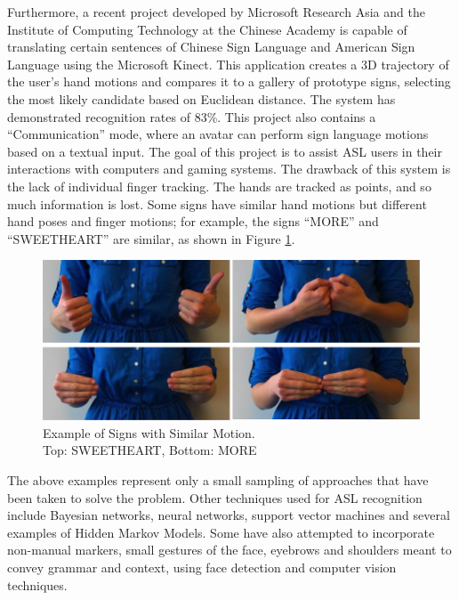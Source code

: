 \documentclass[12pt]{article}
\begin{document}
Furthermore, a recent project developed by Microsoft Research Asia and the Institute of Computing Technology at the Chinese Academy is capable of translating certain sentences of Chinese Sign Language and American Sign Language using the Microsoft Kinect. \cite{Chai} This application creates a 3D trajectory of the user’s hand motions and compares it to a gallery of prototype signs, selecting the most likely candidate based on Euclidean distance. The system has demonstrated recognition rates of 83\%. This project also contains a “Communication” mode, where an avatar can perform sign language motions based on a textual input. The goal of this project is to assist ASL users in their interactions with computers and gaming systems. The drawback of this system is the lack of individual finger tracking. The hands are tracked as points, and so much information is lost. Some signs have similar hand motions but different hand poses and finger motions; for example, the signs “MORE” and “SWEETHEART” are similar, as shown in Figure \ref{fig:MORE}. 

\begin{figure}[h!]
  \centering
  \includegraphics[scale=1]{MORESWEETHEART.png}
  \caption[Example of Signs with Similar Motion]
  { Example of Signs with Similar Motion.  \\ Top: SWEETHEART, Bottom: MORE  }
  \label{fig:MORE}
\end{figure}

The above examples represent only a small sampling of approaches that have been taken to solve the problem. Other techniques used for ASL recognition include Bayesian networks, \cite{Shira} neural networks, \cite{Oz} support vector machines \cite{Agarwal} and several examples of Hidden Markov Models. \cite{Elmezain}\cite{Moni} Some have also attempted to incorporate non-manual markers, small gestures of the face, eyebrows and shoulders meant to convey grammar and context, using face detection and computer vision techniques. \cite{Liu}
\end{document}
